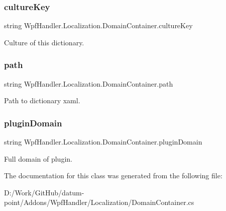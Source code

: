 \subsubsection{\texorpdfstring{culture\+Key}{cultureKey}}
{\footnotesize\ttfamily string Wpf\+Handler.\+Localization.\+Domain\+Container.\+culture\+Key}



Culture of this dictionary. 

\mbox{\label{class_wpf_handler_1_1_localization_1_1_domain_container_a21cb28dec2062a288eca31a2f62c68c1}} 
\subsubsection{\texorpdfstring{path}{path}}
{\footnotesize\ttfamily string Wpf\+Handler.\+Localization.\+Domain\+Container.\+path}



Path to dictionary xaml. 

\mbox{\label{class_wpf_handler_1_1_localization_1_1_domain_container_a7ae59873c6462b5ad0a8331ad39c5ade}} 
\subsubsection{\texorpdfstring{plugin\+Domain}{pluginDomain}}
{\footnotesize\ttfamily string Wpf\+Handler.\+Localization.\+Domain\+Container.\+plugin\+Domain}



Full domain of plugin. 



The documentation for this class was generated from the following file\+:\begin{DoxyCompactItemize}
\item 
D\+:/\+Work/\+Git\+Hub/datum-\/point/\+Addons/\+Wpf\+Handler/\+Localization/Domain\+Container.\+cs\end{DoxyCompactItemize}
